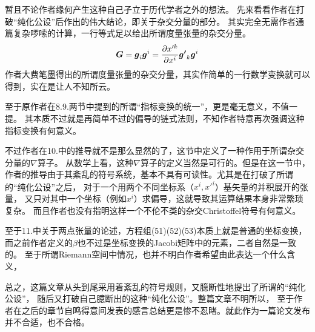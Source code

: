 \documentclass[UTF8]{ctexart}
\begin{document}
暂且不论作者缘何产生这种自己孑立于历代学者之外的想法。
先来看看作者在打破“纯化公设”后作出的伟大结论，即关于杂交分量的部分。
其实完全无需作者通篇复杂啰嗦的计算，一行等式足以给出所谓度量张量的杂交分量。
\begin{equation}
    \boldsymbol{G}
    =\boldsymbol{g}_i \boldsymbol{g}^i
    =\frac{\partial x'^k}{\partial x^i} \boldsymbol{g'}_k \boldsymbol{g}^i
    \notag{}
\end{equation}
作者大费笔墨得出的所谓度量张量的杂交分量，其实作简单的一行数学变换就可以得到，实在是让人不知所云。

至于原作者在8.9.两节中提到的所谓“指标变换的统一”，更是毫无意义，不值一提。
其本质不过就是再简单不过的偏导的链式法则，不知作者特意再次强调这种指标变换有何意义。

不过作者在10.中的推导就不是那么显然的了，这节中定义了一种作用于所谓杂交分量的$\nabla$算子。
从数学上看，这种$\nabla$算子的定义当然是可行的。但是在这一节中，
作者的推导由于其紊乱的符号系统，基本不具有可读性。尤其是在打破了所谓的“纯化公设”之后，
对于一个用两个不同坐标系（$x^i,x'^i$）基矢量的并积展开的张量，
又只对其中一个坐标（例如$x^i$）求偏导，这就导致其运算结果本身非常繁琐复杂。
而且作者也没有指明这样一个不伦不类的杂交Christoffel符号有何意义。

至于11.中关于两点张量的论述，方程组(51)(52)(53)本质上就是普通的坐标变换，
而之前作者定义的$\beta$也不过是坐标变换的Jacobi矩阵中的元素，二者自然是一致的。
至于所谓Riemann空间中情况，也并不明白作者希望由此表达一个什么含义，

总之，这篇文章从头到尾采用着紊乱的符号规则，又臆断性地提出了所谓的“纯化公设”，
随后又打破自己臆断出的这种“纯化公设”。整篇文章不明所以，
至于作者在之后的章节自鸣得意间发表的感言总结更是惨不忍睹。就此作为一篇论文发布并不合适，也不合格。
\end{document}
